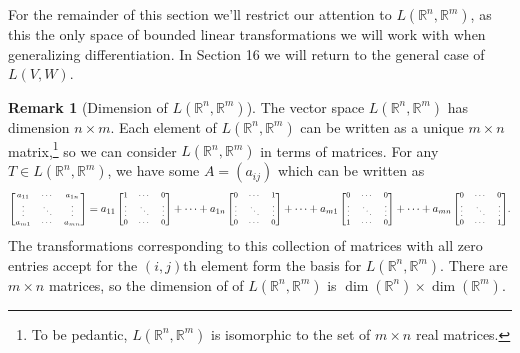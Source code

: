 \documentclass{article}
\newcommand{\R}{\mathbb{R}}
\renewcommand{\a}{\mathbf{a}}
\theoremstyle{definition}
\newtheorem{remark}{Remark}[section]
\begin{document}
For the remainder of this section we'll restrict our attention to $ L(\R^n,\R^m) $, as this the only space of bounded linear transformations we will work with when generalizing differentiation. In Section 16 we will return to the general case of $ L(V,W) $.

\begin{remark}[Dimension of $ L(\R^n,\R^m) $]
	The vector space $ L(\R^n,\R^m) $ has dimension $ n\times m $. Each element of $ L(\R^n,\R^m) $ can be written as a unique $ m\times n $ matrix,\footnote{To be pedantic, $ L(\R^n,\R^m) $ is isomorphic to the set of $ m\times n $ real matrices.} so we can consider $ L(\R^n,\R^m) $ in terms of matrices. For any $ T\in   L(\R^n,\R^m) $, we have some $ A=(a_{ij}) $ which can be written as 
	$$ {\scriptsize\begin{bmatrix}a_{11}&\cdots &a_{1n}\\ \vdots  &\ddots &\vdots \\a_{m1}&\cdots &a_{mn}\end{bmatrix} = a_{11} \begin{bmatrix}1&\cdots &0\\ \vdots  &\ddots &\vdots \\0&\cdots &0\end{bmatrix} + \cdots + a_{1n} \begin{bmatrix}0&\cdots &1\\ \vdots  &\ddots &\vdots \\0&\cdots &0\end{bmatrix} +\cdots +  a_{m1} \begin{bmatrix}0&\cdots &0\\ \vdots  &\ddots &\vdots \\1&\cdots &0\end{bmatrix} + \cdots + a_{mn} \begin{bmatrix}0&\cdots &0\\ \vdots  &\ddots &\vdots \\0&\cdots &1\end{bmatrix}}.$$
	The transformations corresponding to this collection of matrices with all zero entries accept for the $ (i,j) $th element form the basis for $ L(\R^n,\R^m) $. There are $ m\times n $ matrices, so the dimension of of $ L(\R^n,\R^m) $ is $ \dim(\R^n)\times \dim(\R^m) $. 
\end{remark}
\end{document}
